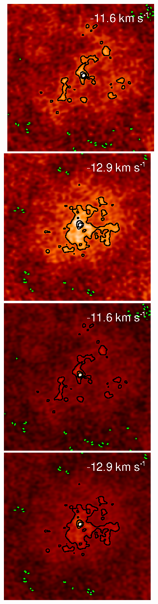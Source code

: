 \documentclass[preprint2]{aastex}
\begin{document}
\begin{figure}[hbt!]
{          }
\\
\mbox{
          \includegraphics[]{test36.ps}
          \includegraphics[]{test37.ps}
          \includegraphics[]{test_36.ps}
          \includegraphics[]{test_37.ps}
}
\end{figure}
\end{document}
